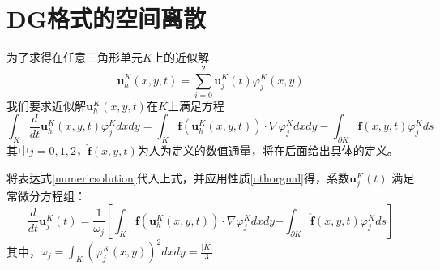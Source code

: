 \documentclass[a4paper, 12pt, UTF8]{ctexart}
\newcommand{\bs}[1]{\boldsymbol{#1}}
\begin{document}
\newpage

\section{DG格式的空间离散}

为了求得在任意三角形单元$K$上的近似解  
\begin{equation}\label{spacediscritization}
\bs u^K_{h}(x, y, t)=\sum\limits_{i=0}^{2} \bs u^K_{j}(t) \varphi_{j}^K(x, y)
\end{equation}
我们要求近似解$\bs u^K_h(x, y, t)$在$K$上满足方程
\begin{equation}
\int_K\frac{d}{d t} \bs u_{h}^K(x, y, t)\varphi_j^Kdxdy=\int_K\bs f(\bs u_{h}^K(x, y, t))\cdot\nabla\varphi_j^Kdxdy-\int_{\partial K}\hat{\bs f}(x, y, t)\varphi_j^Kds
\end{equation}
其中$j=0, 1, 2$，$\hat{\bs f}(x, y, t)$为人为定义的数值通量，将在后面给出具体的定义。

 将表达式\eqref{numericsolution}代入上式，并应用性质\eqref{othorgnal}得，系数$\bs u_{j}^K(t)$ 满足常微分方程组：
\begin{equation}\label{semidiscrete}
 \frac{d}{d t} \bs u_{j}^K(t)=\frac{1}{\omega_{j}}\left[\int_{K} {\bs f}\left(\bs u_{h}^K(x, y, t)\right) \cdot \nabla \varphi_{j}^Kd x d y\right. \left.-\int_{\partial K}\hat{\bs f}\left(x, y, t\right) \varphi_{j}^K d s\right] 
\end{equation}
其中，$\omega_{j}=\int_{K} (\varphi_{j}^K(x, y))^2 d x d y=\frac{|K|}{3}$
\end{document}
